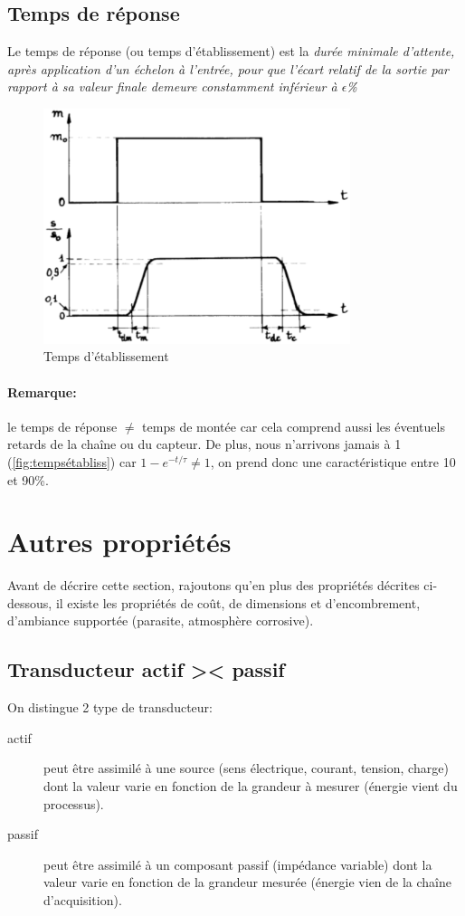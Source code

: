 \subsection{Temps de réponse}
Le temps de réponse (ou temps d'établissement) est la \emph{durée minimale d'attente, après application d'un échelon à l'entrée, pour que l'écart relatif de la sortie par rapport à sa valeur finale demeure constamment inférieur à \(\epsilon\)\%}
\begin{figure}[H] 
	\centering 
	\includegraphics[width=0.8\textwidth,height=10\baselineskip,keepaspectratio]{ch2/image12} 
	\caption{Temps d'établissement} 
	\label{fig:tempsétabliss}
\end{figure}
\paragraph{Remarque:} le temps de réponse \(\neq\) temps de montée car cela comprend aussi les éventuels retards de la chaîne ou du capteur. De plus, nous n'arrivons jamais à 1 (\autoref{fig:tempsétabliss}) car \(1-e^{-t/\tau}\neq 1\), on prend donc une caractéristique entre 10 et 90\%.
\section{Autres propriétés}
Avant de décrire cette section, rajoutons qu'en plus des propriétés décrites ci-dessous, il existe les propriétés de coût, de dimensions et d'encombrement, d'ambiance supportée (parasite, atmosphère corrosive).
\subsection{Transducteur actif >< passif}
On distingue 2 type de transducteur:
\begin{description}
	\item[actif] peut être assimilé à une source (sens électrique, courant, tension, charge) dont la valeur varie en fonction de la grandeur à mesurer (énergie vient du processus).
	\item[passif] peut être assimilé à un composant passif (impédance variable) dont la valeur varie en fonction de la grandeur mesurée (énergie vien de la chaîne d'acquisition).
\end{description}
